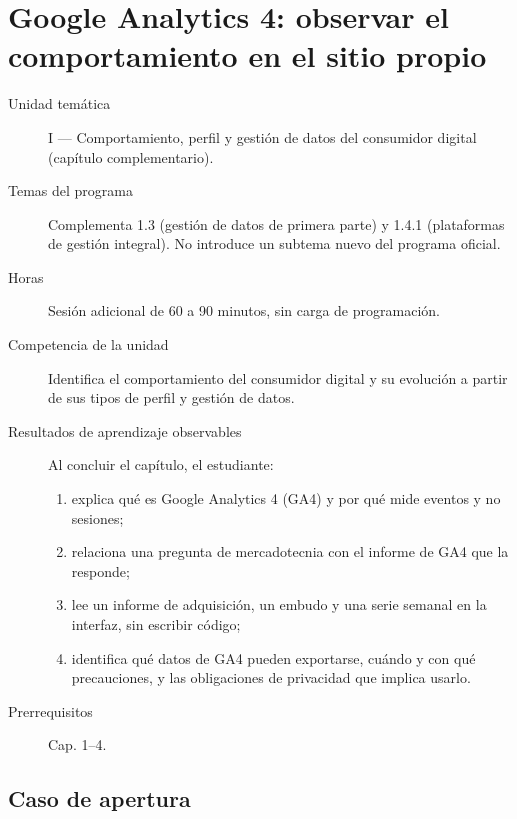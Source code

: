 \chapter{Google Analytics 4: observar el comportamiento en el sitio propio}
\label{cap:05}

\begin{cajaFicha}
\begin{description}
  \item[Unidad temática] I — Comportamiento, perfil y gestión de datos del consumidor digital (capítulo complementario).
  \item[Temas del programa] Complementa 1.3 (gestión de datos de primera parte) y 1.4.1 (plataformas de gestión integral). No introduce un subtema nuevo del programa oficial.
  \item[Horas] Sesión adicional de 60 a 90 minutos, sin carga de programación.
  \item[Competencia de la unidad] Identifica el comportamiento del consumidor digital y su evolución a partir de sus tipos de perfil y gestión de datos.
  \item[Resultados de aprendizaje observables] Al concluir el capítulo, el estudiante:
  \begin{enumerate}
    \item explica qué es Google Analytics 4 (GA4) y por qué mide eventos y no sesiones;
    \item relaciona una pregunta de mercadotecnia con el informe de GA4 que la responde;
    \item lee un informe de adquisición, un embudo y una serie semanal en la interfaz, sin escribir código;
    \item identifica qué datos de GA4 pueden exportarse, cuándo y con qué precauciones, y las obligaciones de privacidad que implica usarlo.
  \end{enumerate}
  \item[Prerrequisitos] Cap. 1--4.
\end{description}
\end{cajaFicha}

\section{Caso de apertura}

